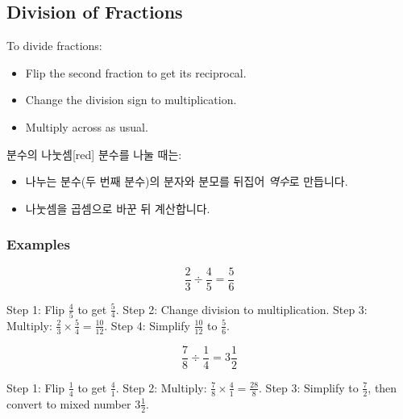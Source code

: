 \documentclass[12pt]{book}
\begin{document}
  \twosidedpaper
  \subsection{Division of Fractions}
  
  To divide fractions:  
  \begin{itemize}
    \item Flip the second fraction to get its reciprocal.  
    \item Change the division sign to multiplication.  
    \item Multiply across as usual.  
  \end{itemize}
  
  \begin{flexbox}{분수의 나눗셈}[red]
  분수를 나눌 때는:  
  \begin{itemize}
    \item 나누는 분수(두 번째 분수)의 분자와 분모를 뒤집어 \textit{역수}로 만듭니다.  
    \item 나눗셈을 곱셈으로 바꾼 뒤 계산합니다.  
  \end{itemize}
  \end{flexbox}
  
  \subsubsection*{Examples}
  
  \[
  \dfrac{2}{3} \div \dfrac{4}{5} = \dfrac{5}{6}
  \]
  
  Step 1: Flip $\tfrac{4}{5}$ to get $\tfrac{5}{4}$.  
  Step 2: Change division to multiplication.  
  Step 3: Multiply: $\tfrac{2}{3} \times \tfrac{5}{4} = \tfrac{10}{12}$.  
  Step 4: Simplify $\tfrac{10}{12}$ to $\tfrac{5}{6}$.  
  
  
  
  
  \[
  \dfrac{7}{8} \div \dfrac{1}{4} = 3 \dfrac{1}{2}
  \]
  
  Step 1: Flip $\tfrac{1}{4}$ to get $\tfrac{4}{1}$.  
  Step 2: Multiply: $\tfrac{7}{8} \times \tfrac{4}{1} = \tfrac{28}{8}$.  
  Step 3: Simplify to $\tfrac{7}{2}$, then convert to mixed number $3 \tfrac{1}{2}$.  
  
  
\end{document}
